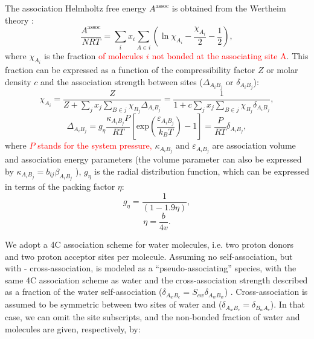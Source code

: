 The association Helmholtz free energy $A^\text{assoc}$ is obtained from the Wertheim theory \cite{Wertheim1984}:
\begin{equation}
        \frac{A^\text{assoc}}{NRT} =  \sum_i x_i \sum_{A \in i}  \left ( \ln{\chi_{A_i}} -\frac{\chi_{A_i}}{2} -\frac{1}{2} \right ),
        \label{Eq:Aassoc}
\end{equation}
where $\chi_{A_i}$  is the fraction \textcolor{red}{of molecules $i$ not bonded at the associating site A}. This fraction can be expressed as a function of the compressibility factor $Z$ or molar density $c$ and the association strength between sites ($\Delta_{A_iB_j}$ or $\delta_{A_iB_j}$):
\begin{equation}
    \chi_{A_i} = \frac{Z}{Z+\sum\limits_jx_j \sum\limits_{B \in j} \chi_{B_j}\Delta_{A_iB_j}} = \frac{1}{1+c \sum\limits_j x_j \sum\limits_{B \in j} \chi_{B_j}\delta_{A_iB_j}},
    \label{Eq:CPA_chi}
\end{equation}
\begin{equation}
    \Delta_{A_iB_j} = g_\eta \frac{\kappa_{A_iB_j} P}{RT}\left[ \text{exp}\left( \frac{\varepsilon_{A_iB_j}}{k_BT}\right) -1 \right] = \frac{P}{RT} \delta_{A_iB_j}
    \label{Eq:CPA_delta},
\end{equation}
where \textcolor{red}{$P$ stands for the system pressure,} $\kappa_{A_iB_j}$ and  $\varepsilon_{A_iB_j}$ are association volume and association energy parameters (the volume parameter can also be expressed by $\kappa_{A_iB_j} = b_{ij}\beta_{A_iB_j}$ \cite{Olsen2021}), $g_\eta$ is the radial distribution function, which can be expressed in terms of the packing factor $\eta$: 
\begin{equation}
    g_\eta = \frac{1}{\left(1-1.9\eta\right) },
    \label{CPA_g}
\end{equation}
\begin{equation}
    \eta = \frac{b}{4v}.
    \label{CPA_eta}
\end{equation}

We adopt a 4C association scheme for water molecules, i.e. two proton donors and two proton acceptor sites per molecule. Assuming no  self-association, but with - cross-association,  is modeled as a ``pseudo-associating'' species, with the same 4C association scheme as water and the cross-association strength described as a fraction of the water self-association ($\delta_{A_wB_c} = S_{cw}\delta_{A_wB_w}$) \cite{Li2009}. Cross-association is assumed to be symmetric between two sites of water and  ($\delta_{A_wB_c} = \delta_{B_wA_c}$). In that case, we can omit the site subscripts, and the non-bonded fraction of water and  molecules are given, respectively, by:

